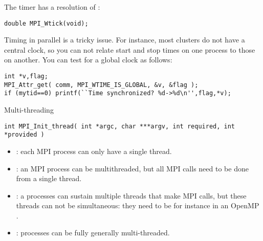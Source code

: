 The timer has a resolution of :
\begin{verbatim}
double MPI_Wtick(void);
\end{verbatim}

Timing in parallel is a tricky issue. For instance, most clusters do
not have a central clock, so you can not relate start and stop times
on one process to those on another. You can test for a global clock as
follows:
\begin{verbatim}
int *v,flag;
MPI_Attr_get( comm, MPI_WTIME_IS_GLOBAL, &v, &flag );
if (mytid==0) printf(``Time synchronized? %d->%d\n'',flag,*v);
\end{verbatim}


 {Multi-threading}

\begin{verbatim}
int MPI_Init_thread( int *argc, char ***argv, int required, int *provided )
\end{verbatim}

\begin{itemize}
\item {}: each MPI process can only have
  a single thread.
\item {}: an MPI process can be
  multithreaded, but all MPI calls need to be done from a single
  thread.
\item {}: a processes can sustain
  multiple threads that make MPI calls, but these threads can not be
  simultaneous: they need to be for instance in an OpenMP
  .
\item {}: processes can be fully
  generally multi-threaded.
\end{itemize}
